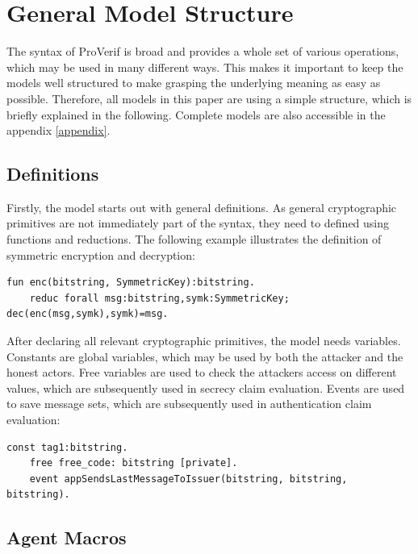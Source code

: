 \documentclass[11pt,twoside,a4paper,openright]{book}
\begin{document}

\newpage
\section{General Model Structure}

The syntax of ProVerif is broad and provides a whole set of various operations, which may be used in many different ways. This makes it important to keep the models well structured to make grasping the underlying meaning as easy as possible. Therefore, all models in this paper are using a simple structure, which is briefly explained in the following. Complete models are also accessible in the appendix \ref{appendix}.

\subsection{Definitions}

Firstly, the model starts out with general definitions. As general cryptographic primitives are not immediately part of the syntax, they need to defined using functions and reductions. The following example illustrates the definition of symmetric encryption and decryption:

\begin{Verbatim}[fontsize=\small]
    fun enc(bitstring, SymmetricKey):bitstring.
    reduc forall msg:bitstring,symk:SymmetricKey; dec(enc(msg,symk),symk)=msg.
\end{Verbatim}

After declaring all relevant cryptographic primitives, the model needs variables. Constants are global variables, which may be used by both the attacker and the honest actors. Free variables are used to check the attackers access on different values, which are subsequently used in secrecy claim evaluation. Events are used to save message sets, which are subsequently used in authentication claim evaluation:

\begin{Verbatim}[fontsize=\small]
    const tag1:bitstring.
    free free_code: bitstring [private].
    event appSendsLastMessageToIssuer(bitstring, bitstring, bitstring).
\end{Verbatim}

\subsection{Agent Macros}
\end{document}
